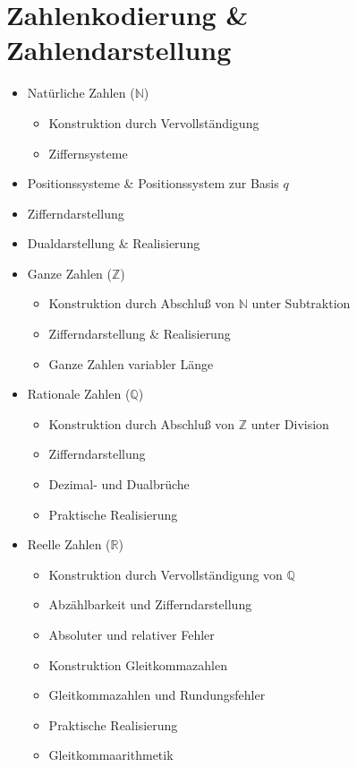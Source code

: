 \documentclass[numbers=endperiod]{scrartcl}
\begin{document}
\section{Zahlenkodierung \& Zahlendarstellung}
\begin{itemize}
	\item Natürliche Zahlen ($\mathbb{N}$)
	\begin{itemize}
		\item Konstruktion durch Vervollständigung
		\item Ziffernsysteme
	\end{itemize}
	\item Positionssysteme \& Positionssystem zur Basis $q$
	\item Zifferndarstellung
	\item Dualdarstellung \& Realisierung
	\item Ganze Zahlen ($\mathbb{Z}$)
	\begin{itemize}
		\item Konstruktion durch Abschluß von $\mathbb{N}$ unter Subtraktion
		\item Zifferndarstellung \& Realisierung
		\item Ganze Zahlen variabler Länge
	\end{itemize}
	\item Rationale Zahlen ($\mathbb{Q}$)
	\begin{itemize}
		\item Konstruktion durch Abschluß von $\mathbb{Z}$ unter Division
		\item Zifferndarstellung 
		\item Dezimal- und Dualbrüche
		\item Praktische Realisierung
	\end{itemize}
	\item Reelle Zahlen ($\mathbb{R}$)
	\begin{itemize}
		\item Konstruktion durch Vervollständigung von $\mathbb{Q}$
		\item Abzählbarkeit und Zifferndarstellung
		\item Absoluter und relativer Fehler
		\item Konstruktion Gleitkommazahlen
		\item Gleitkommazahlen und Rundungsfehler
		\item Praktische Realisierung
		\item Gleitkommaarithmetik
	\end{itemize}
\end{itemize}
\end{document}
